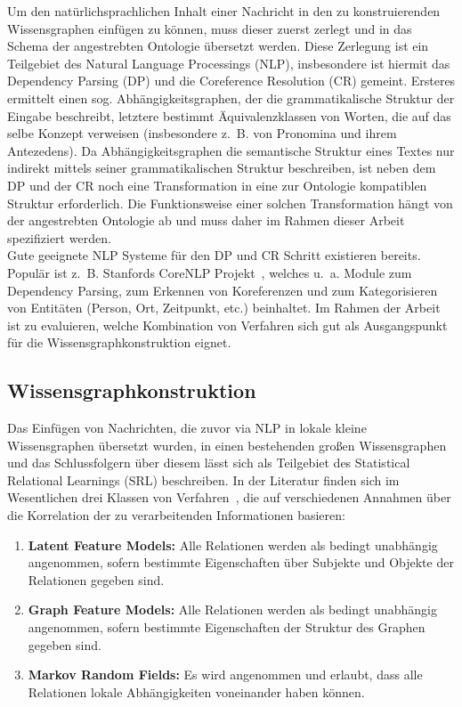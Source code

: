 \documentclass[11pt, a4paper]{scrreprt}
\begin{document}
Um den natürlichsprachlichen Inhalt einer Nachricht in den zu konstruierenden Wissensgraphen einfügen zu können, muss dieser zuerst zerlegt und in das Schema der angestrebten Ontologie übersetzt werden.
Diese Zerlegung ist ein Teilgebiet des Natural Language Processings (NLP), insbesondere ist hiermit das Dependency Parsing (DP) und die Coreference Resolution (CR) gemeint.
Ersteres ermittelt einen sog. Abhängigkeitsgraphen, der die grammatikalische Struktur der Eingabe beschreibt, letztere bestimmt Äquivalenzklassen von Worten, die auf das selbe Konzept verweisen (insbesondere z.~B. von Pronomina und ihrem Antezedens).
Da Abhängigkeitsgraphen die semantische Struktur eines Textes nur indirekt mittels seiner grammatikalischen Struktur beschreiben, ist neben dem DP und der CR noch eine Transformation in eine zur Ontologie kompatiblen Struktur erforderlich.
Die Funktionsweise einer solchen Transformation hängt von der angestrebten Ontologie ab und muss daher im Rahmen dieser Arbeit spezifiziert werden.\\

Gute geeignete NLP Systeme für den DP und CR Schritt existieren bereits.
Populär ist z.~B. Stanfords CoreNLP Projekt~\cite{manning:2014}, welches u.~a. Module zum Dependency Parsing, zum Erkennen von Koreferenzen und zum Kategorisieren von Entitäten (Person, Ort, Zeitpunkt, etc.) beinhaltet.
Im Rahmen der Arbeit ist zu evaluieren, welche Kombination von Verfahren sich gut als Ausgangspunkt für die Wissensgraphkonstruktion eignet.

\subsection{Wissensgraphkonstruktion}

Das Einfügen von Nachrichten, die zuvor via NLP in lokale kleine Wissensgraphen übersetzt wurden, in einen bestehenden großen Wissensgraphen und das Schlussfolgern über diesem lässt sich als Teilgebiet des Statistical Relational Learnings (SRL) beschreiben.
In der Literatur finden sich im Wesentlichen drei Klassen von Verfahren~\cite{nickel:2016}, die auf verschiedenen Annahmen über die Korrelation der zu verarbeitenden Informationen basieren:
\begin{enumerate}
	\item \textbf{Latent Feature Models:}
		Alle Relationen werden als bedingt unabhängig angenommen, sofern bestimmte Eigenschaften über Subjekte und Objekte der Relationen gegeben sind.
	\item \textbf{Graph Feature Models:}
		Alle Relationen werden als bedingt unabhängig angenommen, sofern bestimmte Eigenschaften der Struktur des Graphen gegeben sind.
	\item \textbf{Markov Random Fields:}
		Es wird angenommen und erlaubt, dass alle Relationen lokale Abhängigkeiten voneinander haben können.
\end{enumerate}
\end{document}
